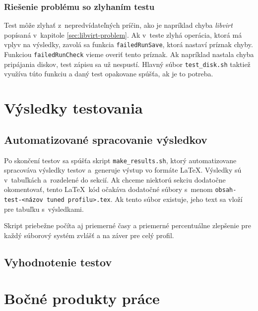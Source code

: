 \subsection{Riešenie problému so zlyhaním testu}
\label{sec:test-failure}

Test môže zlyhať z~nepredvídateľných príčin, ako je napríklad chyba
\emph{libvirt} popísaná v~kapitole \ref{sec:libvirt-problem}. Ak v~teste zlyhá
operácia, ktorá má vplyv na výsledky, zavolá sa funkcia \texttt{failedRunSave},
ktorá nastaví príznak chyby. Funkciou \texttt{failedRunCheck} vieme overiť
tento príznak. Ak napríklad nastala chyba pripájania diskov, test zápisu sa už
nespustí. Hlavný súbor \texttt{test\_disk.sh} taktiež využíva túto funkciu a
daný test opakovane spúšťa, ak je to potreba.

%
%

\chapter{Výsledky testovania}
\label{chap:test-results}

\section{Automatizované spracovanie výsledkov}

Po skončení testov sa spúšťa skript \texttt{make\_results.sh}, ktorý
automatizovane spracováva výsledky testov a~generuje výstup vo formáte \LaTeX.
Výsledky sú v~tabuľkách a~rozdelené do sekcií. Ak chceme niektorú sekciu
dodatočne okomentovať, tento \LaTeX~kód očakáva dodatočné súbory s~menom
\texttt{obsah-test-<názov tuned profilu>.tex}. Ak tento súbor existuje, jeho
text sa vloží pre tabuľku s~výsledkami.

Skript priebežne počíta aj priemerné časy a priemerné percentuálne zlepšenie
pre každý súborový systém zvlášť a na záver pre celý profil. 

%
%

\section{Vyhodnotenie testov}


%
%

\chapter{Bočné produkty práce}

